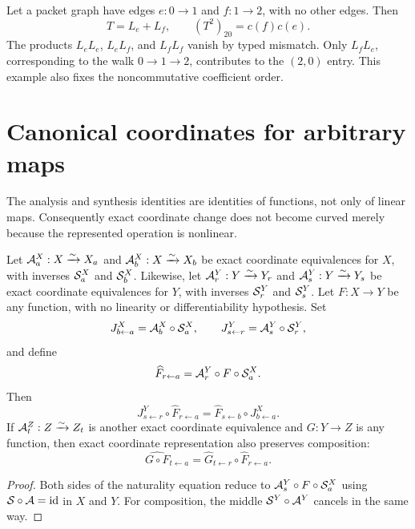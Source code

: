 \begin{example}
Let a packet graph have edges $e:0\to1$ and $f:1\to2$, with no other edges.
Then
\[
T=L_e+L_f,\qquad
(T^2)_{20}=c(f)c(e).
\]
The products $L_eL_e$, $L_eL_f$, and $L_fL_f$ vanish by typed mismatch.
Only $L_fL_e$, corresponding to the walk $0\to1\to2$, contributes to the
$(2,0)$ entry.  This example also fixes the noncommutative coefficient order.
\end{example}

\section{Canonical coordinates for arbitrary maps}
\label{sec:arbitrary-maps}

The analysis and synthesis identities are identities of functions, not only
of linear maps.  Consequently exact coordinate change does not become
curved merely because the represented operation is nonlinear.

\begin{proposition}
\label{prop:set-naturality}
Let $\mathcal A^X_a:X\xrightarrow{\sim}X_a$ and
$\mathcal A^X_b:X\xrightarrow{\sim}X_b$ be exact coordinate equivalences for $X$,
with inverses $\mathcal S^X_a$ and $\mathcal S^X_b$.  Likewise, let
$\mathcal A^Y_r:Y\xrightarrow{\sim}Y_r$ and
$\mathcal A^Y_s:Y\xrightarrow{\sim}Y_s$ be exact coordinate equivalences for $Y$,
with inverses $\mathcal S^Y_r$ and $\mathcal S^Y_s$.  Let $F:X\to Y$ be any function, with
no linearity or differentiability hypothesis.  Set
\[
J^X_{b\leftarrow a}=\mathcal A^X_b\circ\mathcal S^X_a,
\qquad
J^Y_{s\leftarrow r}=\mathcal A^Y_s\circ\mathcal S^Y_r,
\]
and define
\[
\widehat F_{r\leftarrow a}
=
\mathcal A^Y_r\circ F\circ\mathcal S^X_a.
\]
Then
\[
J^Y_{s\leftarrow r}\circ\widehat F_{r\leftarrow a}
=
\widehat F_{s\leftarrow b}\circ J^X_{b\leftarrow a}.
\]
If $\mathcal A^Z_t:Z\xrightarrow{\sim}Z_t$ is another exact coordinate equivalence
and $G:Y\to Z$ is any function, then exact coordinate representation also
preserves composition:
\[
\widehat{G\circ F}_{t\leftarrow a}
=
\widehat G_{t\leftarrow r}\circ\widehat F_{r\leftarrow a}.
\]
\end{proposition}

\begin{proof}
Both sides of the naturality equation reduce to
$\mathcal A^Y_s\circ F\circ\mathcal S^X_a$ using
$\mathcal S\circ\mathcal A=\mathrm{id}$ in $X$ and $Y$.  For composition, the middle
$\mathcal S^Y\circ\mathcal A^Y$ cancels in the same way.
\end{proof}

